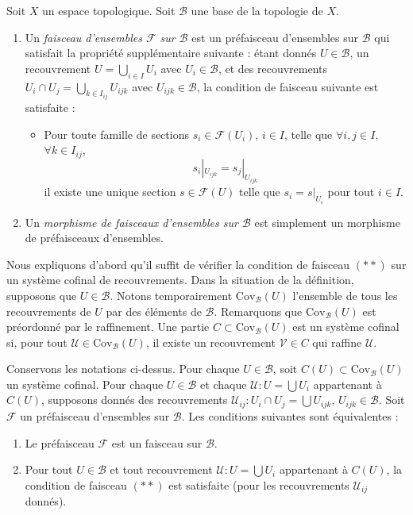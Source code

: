 \begin{definition}
\label{definition-sheaf-basis}
Soit $X$ un espace topologique. Soit $\mathcal{B}$ une
base de la topologie de $X$.
\begin{enumerate}
\item Un {\it faisceau d'ensembles $\mathcal{F}$ sur $\mathcal{B}$} est un préfaisceau
d'ensembles sur $\mathcal{B}$ qui satisfait la propriété supplémentaire
suivante : étant donnés $U \in \mathcal{B}$, un recouvrement
$U = \bigcup_{i \in I} U_i$ avec $U_i \in \mathcal{B}$, et
des recouvrements $U_i \cap U_j = \bigcup_{k \in I_{ij}} U_{ijk}$ avec
$U_{ijk} \in \mathcal{B}$, la condition de faisceau suivante est satisfaite :
\begin{itemize}
\item[(**)] Pour toute famille
de sections $s_i \in \mathcal{F}(U_i)$, $i \in I$, telle que
$\forall i, j\in I$, $\forall k\in I_{ij}$,
$$
s_i|_{U_{ijk}} = s_j|_{U_{ijk}}
$$
il existe une unique section $s \in \mathcal{F}(U)$ telle que
$s_i = s|_{U_i}$ pour tout $i \in I$.
\end{itemize}
\item Un {\it morphisme de faisceaux d'ensembles sur $\mathcal{B}$} est simplement un
morphisme de préfaisceaux d'ensembles.
\end{enumerate}
\end{definition}

\noindent
Nous expliquons d'abord qu'il suffit de
vérifier la condition de faisceau $(**)$
sur un système cofinal de recouvrements.
Dans la situation de la définition, supposons que
$U \in \mathcal{B}$. Notons temporairement
$\text{Cov}_\mathcal{B}(U)$ l'ensemble de tous les recouvrements
de $U$ par des éléments de $\mathcal{B}$.
Remarquons que $\text{Cov}_\mathcal{B}(U)$ est préordonné par le raffinement.
Une partie $C \subset \text{Cov}_\mathcal{B}(U)$ est un
système cofinal si, pour tout $\mathcal{U} \in \text{Cov}_\mathcal{B}(U)$,
il existe un recouvrement $\mathcal{V} \in C$ qui raffine $\mathcal{U}$.

\begin{lemma}
\label{lemma-cofinal-systems-coverings}
Conservons les notations ci-dessus.
Pour chaque $U \in \mathcal{B}$, soit $C(U) \subset \text{Cov}_\mathcal{B}(U)$
un système cofinal. Pour chaque $U \in \mathcal{B}$ et chaque
$\mathcal{U} : U = \bigcup U_i$ appartenant à $C(U)$, supposons donnés des recouvrements
$\mathcal{U}_{ij} : U_i \cap U_j = \bigcup U_{ijk}$,
$U_{ijk} \in \mathcal{B}$.
Soit $\mathcal{F}$ un préfaisceau d'ensembles sur $\mathcal{B}$.
Les conditions suivantes sont équivalentes :
\begin{enumerate}
\item Le préfaisceau $\mathcal{F}$ est un faisceau sur $\mathcal{B}$.
\item Pour tout $U \in \mathcal{B}$ et tout recouvrement
$\mathcal{U} : U = \bigcup U_i$ appartenant à $C(U)$, la condition de faisceau
$(**)$ est satisfaite (pour les recouvrements $\mathcal{U}_{ij}$ donnés).
\end{enumerate}
\end{lemma}

